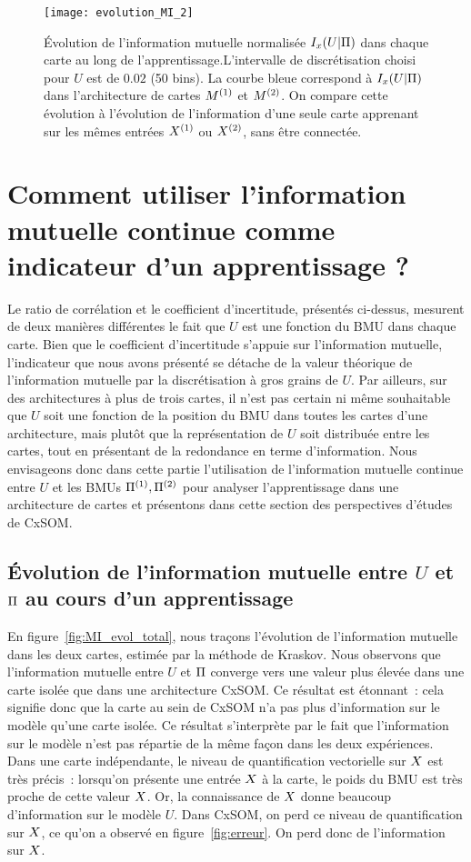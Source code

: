 \documentclass[../main]{subfiles}
\begin{document}
\begin{figure}
\centering\texttt{[image: evolution\_MI\_2]}
\caption{\'Evolution de l'information mutuelle normalisée $I_x(U|\Pi)$ dans chaque carte au long de l'apprentissage.L'intervalle de discrétisation choisi pour $U$ est de $0.02$ (50 bins).
La courbe bleue correspond à $I_x(U|\Pi)$ dans l'architecture de cartes $M^{({1})}$ et $M^{({2})}$. On compare cette évolution à l'évolution de l'information d'une seule carte apprenant sur les mêmes entrées $X^{({1})}$ ou $X^{({2})}$, sans être connectée.}
\label{fig:MI_evol}
\end{figure}

\section{Comment utiliser l'information mutuelle continue comme indicateur d'un apprentissage ?}

Le ratio de corrélation et le coefficient d'incertitude, présentés ci-dessus, mesurent de deux manières différentes le fait que $U$ est une fonction du BMU dans chaque carte.
Bien que le coefficient d'incertitude s'appuie sur l'information mutuelle, l'indicateur que nous avons présenté se détache de la valeur théorique de l'information mutuelle par la discrétisation à gros grains de $U$.
Par ailleurs, sur des architectures à plus de trois cartes, il n'est pas certain ni même souhaitable que $U$ soit une fonction de la position du BMU dans toutes les cartes d'une architecture, mais plutôt que la représentation de $U$ soit distribuée entre les cartes, tout en présentant de la redondance en terme d'information.
Nous envisageons donc dans cette partie l'utilisation de l'information mutuelle continue entre $U$ et les BMUs $\Pi^{({1})}, \Pi^{({2})}$ pour analyser l'apprentissage dans une architecture de cartes et présentons dans cette section des perspectives d'études de CxSOM.

\subsection{\'Evolution de l'information mutuelle entre $U$ et $\Pi$ au cours d'un apprentissage}

En figure~\ref{fig:MI_evol_total}, nous traçons l'évolution de l'information mutuelle dans les deux cartes, estimée par la méthode de Kraskov.
Nous observons que l'information mutuelle entre $U$ et $\Pi$ converge vers une valeur plus élevée dans une carte isolée que dans une architecture CxSOM.
Ce résultat est étonnant~: cela signifie donc que la carte au sein de CxSOM n'a pas plus d'information sur le modèle qu'une carte isolée. 
Ce résultat s'interprète par le fait que l'information sur le modèle n'est pas répartie de la même façon dans les deux expériences.
Dans une carte indépendante, le niveau de quantification vectorielle sur $X$ est très précis~: lorsqu'on présente une entrée $X$ à la carte, le poids du BMU est très proche de cette valeur $X$. 
Or, la connaissance de $X$ donne beaucoup d'information sur le modèle $U$.
Dans CxSOM, on perd ce niveau de quantification sur $X$, ce qu'on a observé en figure~\ref{fig:erreur}. On perd donc de l'information sur $X$.
\end{document}
